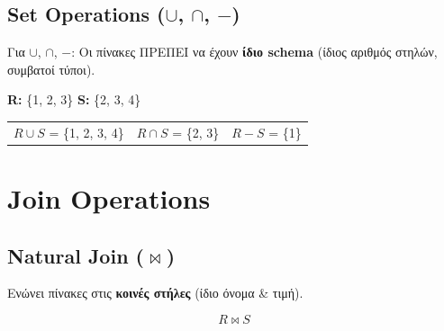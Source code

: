 \subsection{Set Operations (\texorpdfstring{$\cup$, $\cap$, $-$}{union, intersection, difference})}

\begin{warningbox}
Για $\cup$, $\cap$, $-$: Οι πίνακες ΠΡΕΠΕΙ να έχουν \textbf{ίδιο schema} (ίδιος αριθμός στηλών, συμβατοί τύποι).
\end{warningbox}

\begin{examplebox}
\textbf{R:} \{1, 2, 3\} \quad \textbf{S:} \{2, 3, 4\}

\begin{center}
\begin{tabular}{lll}
$R \cup S$ = \{1, 2, 3, 4\} & $R \cap S$ = \{2, 3\} & $R - S$ = \{1\} \\
\end{tabular}
\end{center}
\end{examplebox}

\section{Join Operations}

\subsection{Natural Join (\texorpdfstring{$\bowtie$}{join})}

\begin{formulabox}
Ενώνει πίνακες στις \textbf{κοινές στήλες} (ίδιο όνομα \& τιμή).

\[
R \bowtie S
\]
\end{formulabox}

